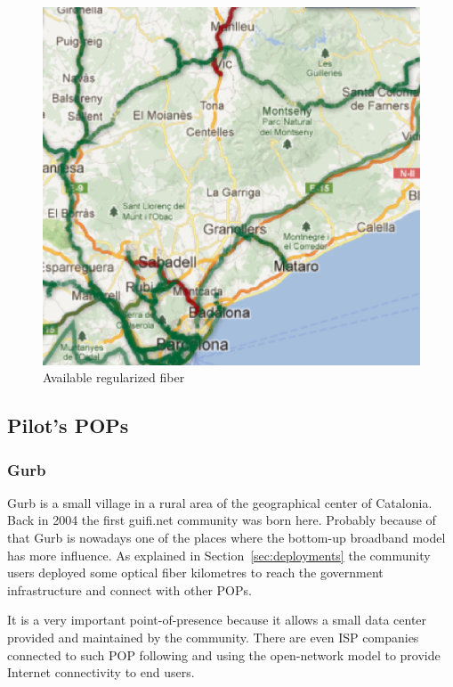 \begin{figure}[htbp]
  \centering
  \includegraphics[scale=.5]{sect3/figures/xoc_map.eps} 
  \caption{Available regularized fiber}
  \label{fig:xoc_map}
\end{figure}



\subsection{Pilot's POPs}

\subsubsection{Gurb}
Gurb is a small village in a rural area of the geographical center of Catalonia. Back in 2004 the first guifi.net community
was born here. Probably because of that Gurb is nowadays one of the places where the bottom-up broadband model has more
influence. As explained in Section~\ref{sec:deployments} the community users deployed some optical fiber kilometres to reach the government
infrastructure and connect with other POPs.


It is a very important point-of-presence because it allows a small data center provided and maintained by the community.
There are even ISP companies connected to such POP following and using the open-network model to provide Internet
connectivity to end users.


